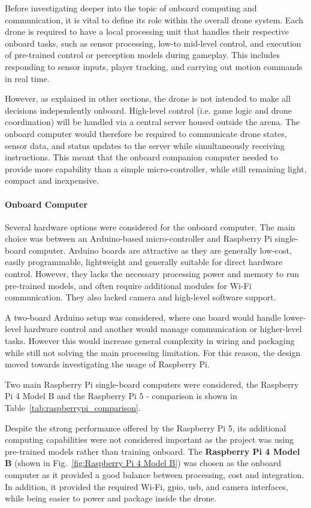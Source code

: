 \documentclass{report_template_oxford}
\begin{document}
Before investigating deeper into the topic of onboard computing and communication, it is vital to define its role within the overall drone system.
Each drone is required to have a local processing unit that handles their respective onboard tasks, such as sensor processing, low-to mid-level control, and execution of pre-trained control or perception models during gameplay. This includes responding to sensor inputs, player tracking, and carrying out motion commands in real time.

However, as explained in other sections, the drone is not intended to make all decisions independently onboard. High-level control (i.e. game logic and drone coordination) will be handled via a central server housed outside the arena. The onboard computer would therefore be required to communicate drone states, sensor data, and status updates to the server while simultaneously receiving instructions. This meant that the onboard companion computer needed to provide more capability than a simple micro-controller, while still remaining light, compact and inexpensive.

\paragraph{Onboard Computer}

Several hardware options were considered for the onboard computer. The main choice was between an Arduino-based micro-controller and Raspberry Pi single-board computer. Arduino boards are attractive as they are generally low-cost, easily programmable, lightweight and generally suitable for direct hardware control. However, they lacks the necessary processing power and memory to run pre-trained models, and often require additional modules for Wi-Fi communication. They also lacked camera and high-level software support.

A two-board Arduino setup was considered, where one board would handle lower-level hardware control and another would manage communication or higher-level tasks. However this would increase general complexity in wiring and packaging while still not solving the main processing limitation. For this reason, the design moved towards investigating the usage of Raspberry Pi.

Two main Raspberry Pi single-board computers were considered, the Raspberry Pi 4 Model B and the Raspberry Pi 5 - comparison is shown in Table~\ref{tab:raspberrypi_comparison}.

Despite the strong performance offered by the Raspberry Pi 5, its additional computing capabilities were not considered important as the project was using pre-trained models rather than training onboard. The \textbf{Raspberry Pi 4 Model B} (shown in Fig.~\ref{fig:Raspberry Pi 4 Model B}) was chosen as the onboard computer as it provided a good balance between processing, cost and integration. In addition, it provided the required Wi-Fi, \gls{gpio}, \gls{usb}, and camera interfaces, while being easier to power and package inside the drone.
\end{document}
